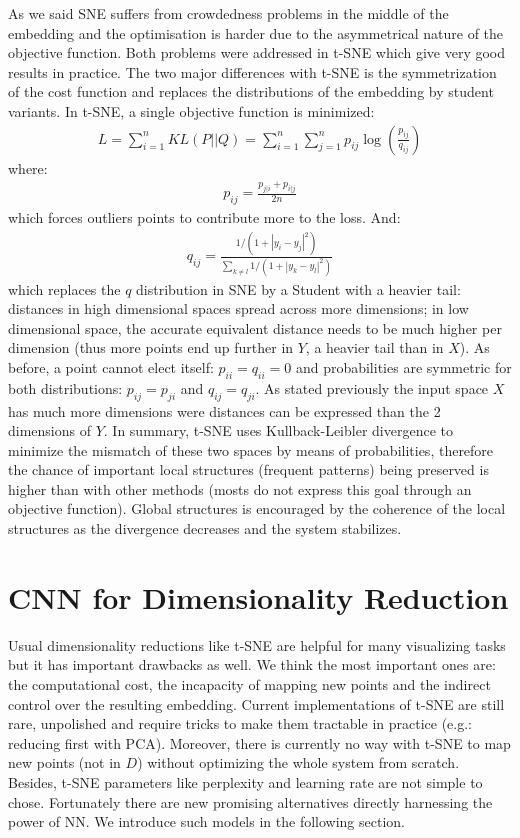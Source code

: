 \documentclass[a4paper,12pt]{report}
\newcommand{\eg}{e.g.}
\begin{document}
As we said SNE suffers from crowdedness problems in the middle of the embedding and the optimisation is harder due to the asymmetrical nature of the objective function.
Both problems were addressed in t-SNE which give very good results in practice.
The two major differences with t-SNE is the symmetrization of the cost function and replaces the distributions of the embedding by student variants.
In t-SNE, a single objective function is minimized:
\begin{eqnarray}
    L = \sum_{i=1}^n KL(P || Q) = \sum_{i=1}^n \sum_{j=1}^n p_{ij} \log\left(\frac{p_{ij}}{q_{ij}}\right)
\end{eqnarray}
where:
\begin{eqnarray}
    p_{ij} = \frac{p_{j|i} + p_{i|j}}{2 n}
\end{eqnarray}
which forces outliers points to contribute more to the loss.
And:
\begin{eqnarray}
    q_{ij} = \frac{1 / (1 + |y_i - y_j|^2)}{\sum_{k \not = l} 1/(1 + |y_k - y_l|^2)}
\end{eqnarray}
which replaces the $q$ distribution in SNE by a Student with a heavier tail: distances in high dimensional spaces spread across more dimensions; in low dimensional space, the accurate equivalent distance needs to be much higher per dimension (thus more points end up further in $Y$, a heavier tail than in $X$).
As before, a point cannot elect itself: $p_{ii} = q_{ii} = 0$ and probabilities are symmetric for both distributions: $p_{ij} = p_{ji}$ and $q_{ij} = q_{ji}$.
As stated previously the input space $X$ has much more dimensions were distances can be expressed than the 2 dimensions of $Y$.
In summary, t-SNE uses Kullback-Leibler divergence to minimize the mismatch of these two spaces by means of probabilities, therefore the chance of important local structures (frequent patterns) being preserved is higher than with other methods (mosts do not express this goal through an objective function).
Global structures is encouraged by the coherence of the local structures as the divergence decreases and the system stabilizes.

\section{CNN for Dimensionality Reduction}
Usual dimensionality reductions like t-SNE are helpful for many visualizing tasks but it has important drawbacks as well.
We think the most important ones are: the computational cost, the incapacity of mapping new points and the indirect control over the resulting embedding.
Current implementations of t-SNE are still rare, unpolished and require tricks to make them tractable in practice (\eg: reducing first with PCA).
Moreover, there is currently no way with t-SNE to map new points (not in $D$) without optimizing the whole system from scratch.
Besides, t-SNE parameters like perplexity and learning rate are not simple to chose.
Fortunately there are new promising alternatives directly harnessing the power of NN.
We introduce such models in the following section.
\end{document}
